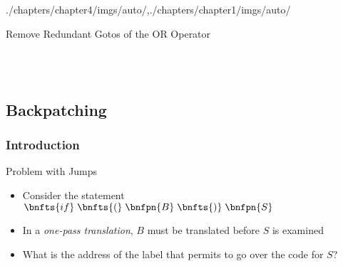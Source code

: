 \begin{graphicspathcontext}{{./chapters/chapter4/imgs/auto/},{./chapters/chapter1/imgs/auto/}}
\begin{bibunit}[apalike]
\begin{frame}[t]{Remove Redundant Gotos of the OR Operator}
	\begin{center}
		\begin{sdd}[.8\linewidth]
		\end{sdd} \\[.1cm]
		 \\[.1cm]
		\begin{sdd}[.8\linewidth]
		\end{sdd}
	\end{center}
\end{frame}

\subsection{Backpatching}

\subsubsection{Introduction}
\subsubsectiontableofcontentslide

\begin{frame}{Problem with Jumps}
	\vspace{1em}
	\begin{example}
		\begin{itemize}
		\item Consider the statement $\bnfts{if} \; \bnfts{(} \; \bnfpn{B} \; \bnfts{)} \; \bnfpn{S}$
		\item In a \emph{one-pass translation}, $B$ must be translated before $S$ is examined
		\item \alert{What is the address of the label that permits to go over the code for $S$?}
		\end{itemize}
	\end{example}
\end{frame}


\end{bibunit}
\end{graphicspathcontext}
